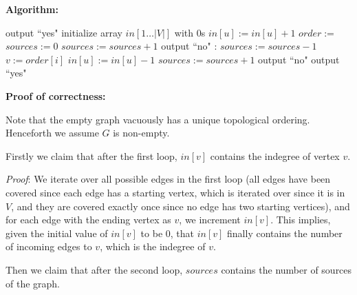 \documentclass[answers]{exam}
\begin{document}
\begin{questions}
\begin{solution}
    \textbf{Algorithm:}

    \begin{algorithmic}
                \State output ``yes"
            \EndIf
            \State initialize array $in[1\ldots |V|]$ with 0s
                    \State $in[u] := in[u] + 1$
                \EndFor
            \EndFor
            \State $order :=$ 
            \State $sources := 0$
                    \State $sources := sources + 1$
                \EndIf
            \EndFor
                \State output ``no"
                \State \Return
            \EndIf
            :
                \State $sources := sources - 1$
                \State $v := order[i]$
                    \State $in[u] := in[u] - 1$
                        \State $sources := sources + 1$
                    \EndIf
                \EndFor
            \EndFor
                \State output ``no"
                \State \Return
            \EndIf
            \State output ``yes"
            \State \Return
        \EndFunction
    \end{algorithmic}

    \textbf{Proof of correctness:}

Note that the empty graph vacuously has a unique topological ordering. Henceforth we assume $G$ is non-empty.

Firstly we claim that after the first loop, $in[v]$ contains the indegree of vertex $v$.

    \textit{Proof}: We iterate over all possible edges in the first loop (all edges have been covered since each edge has a starting vertex, which is iterated over since it is in $V$, and they are
    covered exactly once since no edge has two starting vertices), and for each edge with the ending vertex as $v$, we increment $in[v]$. This implies, given the initial value of $in[v]$ to be $0$,
    that $in[v]$ finally contains the number of incoming edges to $v$, which is the indegree of $v$.

Then we claim that after the second loop, $sources$ contains the number of sources of the graph.


\end{solution}
\end{questions}
\end{document}
